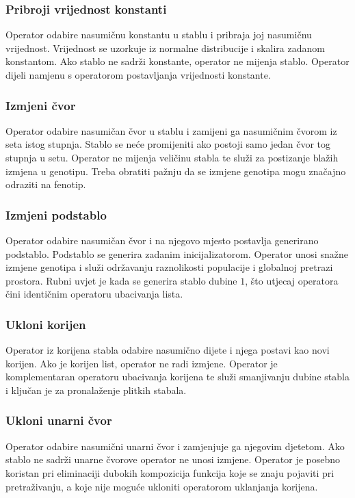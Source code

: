 \documentclass[times, utf8, numeric, diplomski]{fer}
\begin{document}
\subsubsection{Pribroji vrijednost konstanti}
Operator odabire nasumičnu konstantu u stablu i pribraja joj nasumičnu vrijednost. Vrijednost se uzorkuje iz normalne distribucije i skalira zadanom konstantom. Ako stablo ne sadrži konstante, operator ne mijenja stablo. Operator dijeli namjenu s operatorom postavljanja vrijednosti konstante.

\subsubsection{Izmjeni čvor}
Operator odabire nasumičan čvor u stablu i zamijeni ga nasumičnim čvorom iz seta istog stupnja. Stablo se neće promijeniti ako postoji samo jedan čvor tog stupnja u setu. Operator ne mijenja veličinu stabla te služi za postizanje blažih izmjena u genotipu. Treba obratiti pažnju da se izmjene genotipa mogu značajno odraziti na fenotip.

\subsubsection{Izmjeni podstablo}
Operator odabire nasumičan čvor i na njegovo mjesto postavlja generirano podstablo. Podstablo se generira zadanim inicijalizatorom. Operator unosi snažne izmjene genotipa i služi održavanju raznolikosti populacije i globalnoj pretrazi prostora. Rubni uvjet je kada se generira stablo dubine $1$, što utjecaj operatora čini identičnim operatoru ubacivanja lista.

\subsubsection{Ukloni korijen}
Operator iz korijena stabla odabire nasumično dijete i njega postavi kao novi korijen. Ako je korijen list, operator ne radi izmjene. Operator je komplementaran operatoru ubacivanja korijena te služi smanjivanju dubine stabla i ključan je za pronalaženje plitkih stabala.

\subsubsection{Ukloni unarni čvor}
Operator odabire nasumični unarni čvor i zamjenjuje ga njegovim djetetom. Ako stablo ne sadrži unarne čvorove operator ne unosi izmjene. Operator je posebno koristan pri eliminaciji dubokih kompozicija funkcija koje se znaju pojaviti pri pretraživanju, a koje nije moguće ukloniti operatorom uklanjanja korijena.
\end{document}
